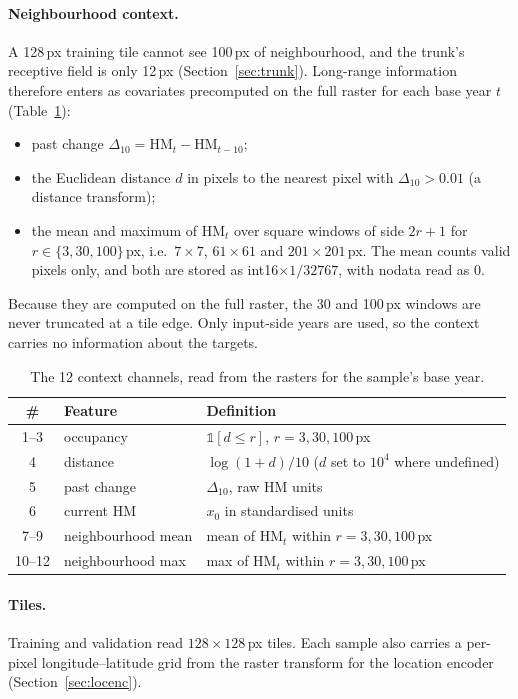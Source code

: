 \documentclass[11pt,a4paper]{article}
\newcommand{\HM}{\mathrm{HM}}
\begin{document}
\paragraph{Neighbourhood context.} A 128\,px training tile cannot see 100\,px of neighbourhood,
and the trunk's receptive field is only 12\,px (Section~\ref{sec:trunk}). Long-range information
therefore enters as covariates precomputed on the full raster for each base year $t$ (Table~\ref{tab:context}):
\begin{itemize}
\item past change $\Delta_{10} = \HM_t - \HM_{t-10}$;
\item the Euclidean distance $d$ in pixels to the nearest pixel with $\Delta_{10}>0.01$
  (a distance transform);
\item the mean and maximum of $\HM_t$ over square windows of side $2r+1$ for
  $r\in\{3,30,100\}$\,px, i.e.\ $7\times7$, $61\times61$ and $201\times201$\,px. The mean counts valid pixels only, and both are stored as
  int16$\times 1/32767$, with nodata read as 0.
\end{itemize}
Because they are computed on the full raster, the 30 and 100\,px windows are never truncated at
a tile edge. Only input-side years are used, so the context carries no information about the
targets.

\begin{table}[h]
\centering\small
\begin{tabular}{@{}clp{7.8cm}@{}}
\toprule
\# & Feature & Definition \\
\midrule
1--3 & occupancy & $\mathbb{1}[d\le r]$, $r = 3, 30, 100$\,px \\
4 & distance & $\log(1+d)/10$ ($d$ set to $10^4$ where undefined) \\
5 & past change & $\Delta_{10}$, raw HM units \\
6 & current HM & $x_0$ in standardised units \\
7--9 & neighbourhood mean & mean of $\HM_t$ within $r=3,30,100$\,px \\
10--12 & neighbourhood max & max of $\HM_t$ within $r=3,30,100$\,px \\
\bottomrule
\end{tabular}
\caption{The 12 context channels, read from the rasters for the sample's base year.}
\label{tab:context}
\end{table}

\paragraph{Tiles.} Training and validation read $128\times128$\,px tiles. Each sample also
carries a per-pixel longitude--latitude grid from the raster transform for the location encoder
(Section~\ref{sec:locenc}).
\end{document}
